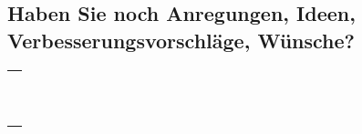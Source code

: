 \documentclass[a4paper]{article}
\begin{document}
{\begin{enumerate}
\end{enumerate}

\vspace{-1.2cm}



\vspace{1cm}

\subsection*{Haben Sie noch Anregungen, Ideen, Verbesserungsvorschläge, Wünsche?}

\begin{tabular}{| p{14.5cm} |}
  	\cline{1-1} \\ \\ \\ \\ \\ \\ \\ \\ \\ \\ \\ \cline{1-1}
\end{tabular}

}
\end{document}

